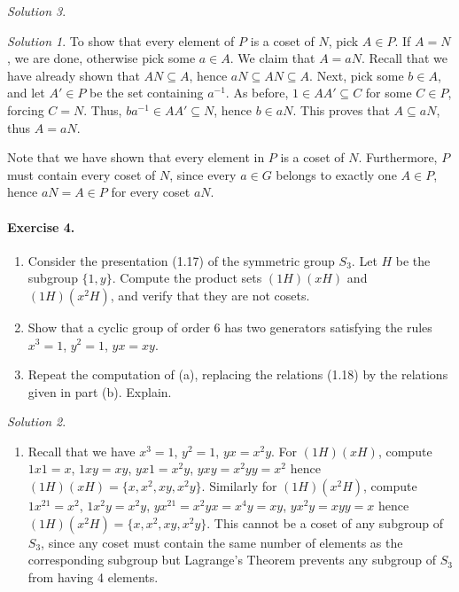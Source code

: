 \documentclass[11pt]{report}
\theoremstyle{remark}
\newtheorem*{solution}{Solution}
\begin{document}
\begin{solution}
\begin{solution}
        To show that every element of $P$ is a coset of $N$, pick $A \in P$. If $A =
        N$, we are done, otherwise pick some $a \in A$. We claim that $A = aN$.
        Recall that we have already shown that $AN \subseteq A$, hence $aN \subseteq
        AN \subseteq A$. Next, pick some $b \in A$, and let $A' \in P$ be the set
        containing $a^{-1}$. As before, $1 \in A A' \subseteq C$ for some $C \in P$,
        forcing $C = N$. Thus, $ba^{-1} \in A A' \subseteq N$, hence $b \in aN$.
        This proves that $A \subseteq aN$, thus $A = aN$.

        Note that we have shown that every element in $P$ is a coset of $N$.
        Furthermore, $P$ must contain every coset of $N$, since every $a \in G$
        belongs to exactly one $A \in P$, hence $aN = A \in P$ for every coset $aN$.
    \end{solution}

    \paragraph{Exercise 4.} \mbox{}
    \begin{enumerate}
        \itemsep0em
        \item Consider the presentation (1.17) of the symmetric group $S_3$. Let $H$
        be the subgroup $\{1, y\}$. Compute the product sets $(1H)(xH)$ and
        $(1H)(x^2H)$, and verify that they are not cosets.
        \item Show that a cyclic group of order $6$ has two generators satisfying the
        rules $x^3 = 1$, $y^2 = 1$, $yx = xy$.
        \item Repeat the computation of (a), replacing the relations (1.18) by the
        relations given in part (b). Explain.
    \end{enumerate}
    \begin{solution} \mbox{}
    \begin{enumerate}
        \item Recall that we have $x^3 = 1$, $y^2 = 1$, $yx = x^2y$. For $(1H)(xH)$,
        compute $1x1 = x$, $1xy = xy$, $yx1 = x^2y$, $yxy = x^2y y = x^2$ hence
        $(1H)(xH) = \{x, x^2, xy, x^2y\}$. Similarly for $(1H)(x^2H)$, compute $1x^21
        = x^2$, $1x^2y = x^2y$, $yx^21 = x^2yx = x^4y = xy$, $yx^2y = xy y = x$ hence
        $(1H)(x^2H) = \{x, x^2, xy, x^2y\}$. This cannot be a coset of any subgroup
        of $S_3$, since any coset must contain the same number of elements as the
        corresponding subgroup but Lagrange's Theorem prevents any subgroup of $S_3$
        from having 4 elements.


\end{enumerate}
\end{solution}
\end{solution}
\end{document}

